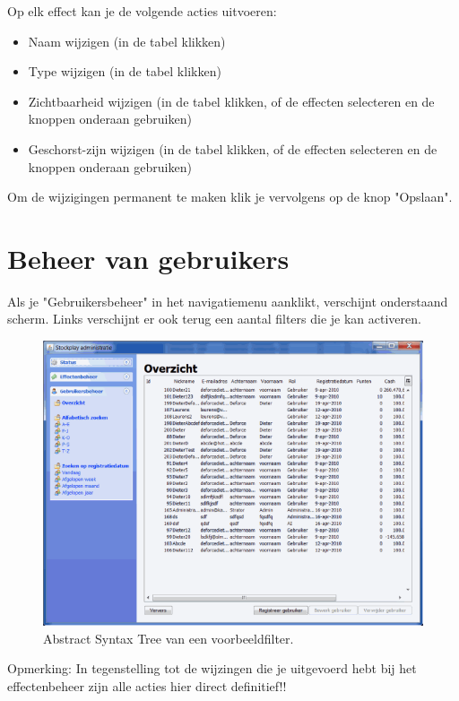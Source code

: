 Op elk effect kan je de volgende acties uitvoeren:

\begin{itemize}
\item{Naam wijzigen (in de tabel klikken)}
\item{Type wijzigen (in de tabel klikken)}
\item{Zichtbaarheid wijzigen (in de tabel klikken, of de effecten selecteren en de knoppen onderaan gebruiken)}
\item{Geschorst-zijn wijzigen (in de tabel klikken, of de effecten selecteren en de knoppen onderaan gebruiken)}
\end{itemize}

Om de wijzigingen permanent te maken klik je vervolgens op de knop "Opslaan".

\section{Beheer van gebruikers}

Als je "Gebruikersbeheer" in het navigatiemenu aanklikt, verschijnt onderstaand scherm.
Links verschijnt er ook terug een aantal filters die je kan activeren.

\begin{figure}[h!]
	\centering
		\includegraphics[width=\textwidth]{images/handleiding/handleiding5.gif}
	\caption{Abstract Syntax Tree van een voorbeeldfilter.}
\end{figure}

Opmerking: In tegenstelling tot de wijzingen die je uitgevoerd hebt bij het effectenbeheer zijn alle acties hier direct definitief!!

